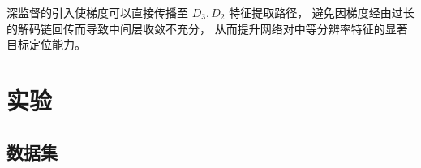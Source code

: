 \documentclass[UTF8,a4paper,10pt]{ctexart}
\begin{document}
深监督的引入使梯度可以直接传播至 $D_3, D_2$ 特征提取路径，
避免因梯度经由过长的解码链回传而导致中间层收敛不充分，
从而提升网络对中等分辨率特征的显著目标定位能力。

\section{实验}

\subsection{数据集}




\end{document}
